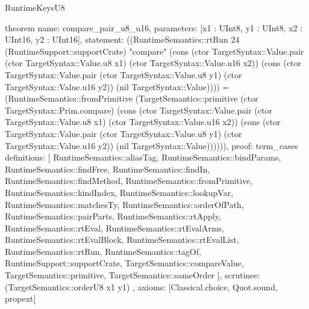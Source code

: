\begin{lexlean}{RuntimeKeysU8}
\begin{semanticmodule}
theorem{
  name: compare_pair_u8_u16,
  parameters: [x1 : UInt8, y1 : UInt8, x2 : UInt16, y2 : UInt16],
  statement: ((RuntimeSemantics::rtRun 24 (RuntimeSupport::supportCrate) "compare" (cons (ctor TargetSyntax::Value.pair (ctor TargetSyntax::Value.u8 x1) (ctor TargetSyntax::Value.u16 x2)) (cons (ctor TargetSyntax::Value.pair (ctor TargetSyntax::Value.u8 y1) (ctor TargetSyntax::Value.u16 y2)) (nil TargetSyntax::Value)))) = (RuntimeSemantics::fromPrimitive (TargetSemantics::primitive (ctor TargetSyntax::Prim.compare) (cons (ctor TargetSyntax::Value.pair (ctor TargetSyntax::Value.u8 x1) (ctor TargetSyntax::Value.u16 x2)) (cons (ctor TargetSyntax::Value.pair (ctor TargetSyntax::Value.u8 y1) (ctor TargetSyntax::Value.u16 y2)) (nil TargetSyntax::Value)))))),
  proof: term_cases{
    definitions: [
      RuntimeSemantics::aliasTag,
      RuntimeSemantics::bindParams,
      RuntimeSemantics::findFree,
      RuntimeSemantics::findIn,
      RuntimeSemantics::findMethod,
      RuntimeSemantics::fromPrimitive,
      RuntimeSemantics::kindIndex,
      RuntimeSemantics::lookupVar,
      RuntimeSemantics::matchesTy,
      RuntimeSemantics::orderOfPath,
      RuntimeSemantics::pairParts,
      RuntimeSemantics::rtApply,
      RuntimeSemantics::rtEval,
      RuntimeSemantics::rtEvalArms,
      RuntimeSemantics::rtEvalBlock,
      RuntimeSemantics::rtEvalList,
      RuntimeSemantics::rtRun,
      RuntimeSemantics::tagOf,
      RuntimeSupport::supportCrate,
      TargetSemantics::compareValue,
      TargetSemantics::primitive,
      TargetSemantics::sameOrder
    ],
    scrutinee: (TargetSemantics::orderU8 x1 y1)
  },
  axioms: [Classical.choice, Quot.sound, propext]
}


\end{semanticmodule}
\end{lexlean}
